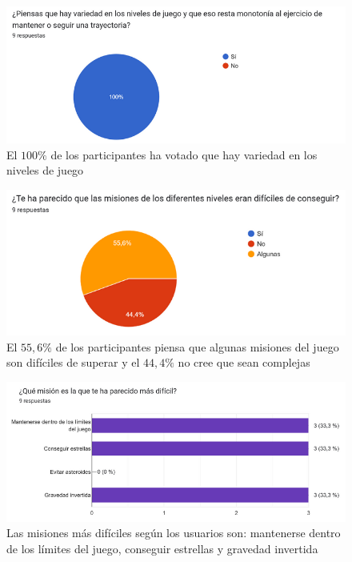 \begin{figure}[ht!]
	\centering
	\begin{minipage}{0.75\linewidth}
		\centering
		\includegraphics[width=\linewidth]{figs/pregunta3.png}
	\end{minipage}
	\caption[Encuesta de satisfacción. Pregunta 3]{El $100\%$ de los participantes ha votado que hay variedad en los niveles de juego}
	\label{fig:level3}
\end{figure}

\begin{figure}[ht!]
	\centering
	\begin{minipage}{0.71\linewidth}
		\centering
		\includegraphics[width=\linewidth]{figs/pregunta4.png}
	\end{minipage}
	\caption[Encuesta de satisfacción. Pregunta 4]{El $55,6\%$ de los participantes piensa que algunas misiones del juego son difíciles de superar y el $44,4\%$ no cree que sean complejas}
	\label{fig:level1}
\end{figure}

\begin{figure}[ht!]
	\centering
	\begin{minipage}{0.85\linewidth}
		\centering
		\includegraphics[width=\linewidth]{figs/pregunta5.png}
	\end{minipage}
	\caption[Encuesta de satisfacción. Pregunta 5]{Las misiones más difíciles según los usuarios son: mantenerse dentro de los límites del juego, conseguir estrellas y gravedad invertida}
	\label{fig:level2}
\end{figure}


